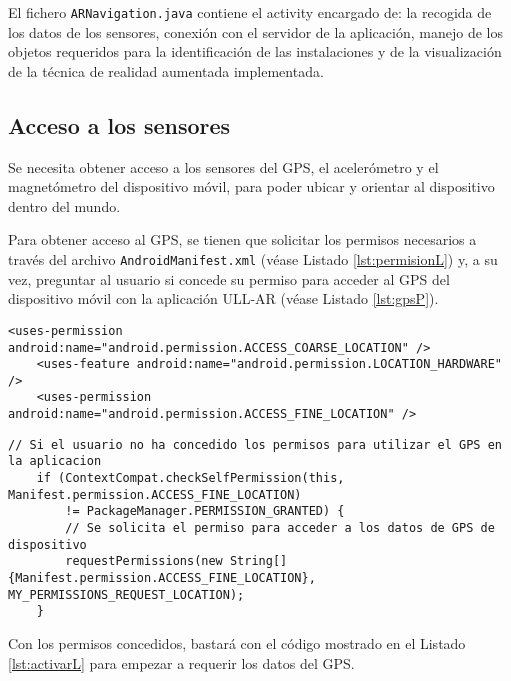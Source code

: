 El fichero \texttt{ARNavigation.java} contiene el activity encargado de: la recogida de los datos de los sensores, conexión con el servidor de la aplicación, manejo de los objetos requeridos para la identificación de las instalaciones y de la visualización de la técnica de realidad aumentada implementada.

\subsection{Acceso a los sensores}

Se necesita obtener acceso a los sensores del GPS, el acelerómetro y el magnetómetro del dispositivo móvil, para poder ubicar y orientar al dispositivo dentro del mundo.

Para obtener acceso al GPS, se tienen que solicitar los permisos necesarios a través del archivo \texttt{AndroidManifest.xml} (véase Listado \ref{lst:permisionL}) y, a su vez, preguntar al usuario si concede su permiso para acceder al GPS del dispositivo móvil con la aplicación ULL-AR  (véase Listado \ref{lst:gpsP}).

\begin{lstlisting}[caption={Fichero \texttt{AndroidManifest.xml} del proyecto, permisos para acceder a la ubicación del dispositivo.}, label={lst:permisionL}]
    <uses-permission android:name="android.permission.ACCESS_COARSE_LOCATION" />
    <uses-feature android:name="android.permission.LOCATION_HARDWARE" />
    <uses-permission android:name="android.permission.ACCESS_FINE_LOCATION" />
\end{lstlisting}

\begin{lstlisting}[caption={Código para que el usuario conceda permiso para acceder a la ubicacióndel dispositivo.}, label={lst:gpsP}]
    // Si el usuario no ha concedido los permisos para utilizar el GPS en la aplicacion
    if (ContextCompat.checkSelfPermission(this, Manifest.permission.ACCESS_FINE_LOCATION)
        != PackageManager.PERMISSION_GRANTED) { 
        // Se solicita el permiso para acceder a los datos de GPS de dispositivo 
        requestPermissions(new String[]{Manifest.permission.ACCESS_FINE_LOCATION},                  MY_PERMISSIONS_REQUEST_LOCATION);  
    }
\end{lstlisting}

Con los permisos concedidos, bastará con el código mostrado en el Listado \ref{lst:activarL} para empezar a requerir los datos del GPS.

\bigskip
\bigskip

